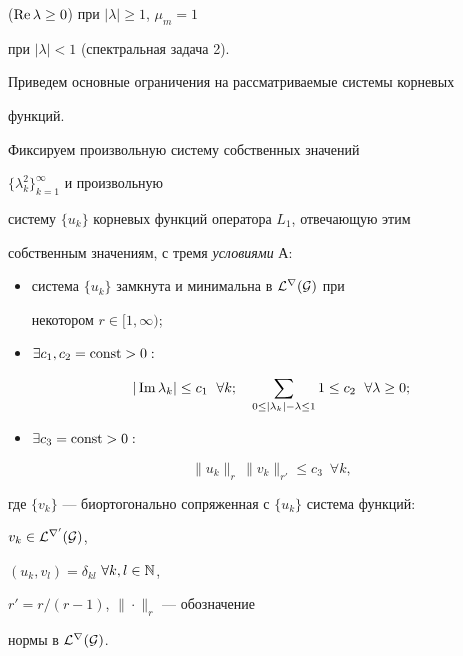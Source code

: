 ($\operatorname{Re}\lambda\ge 0$) при $|\lambda|\ge 1$, $\mu_m=1$


при $|\lambda|<1$ (спектральная задача 2).





Приведем основные ограничения на рассматриваемые системы корневых


функций.


Фиксируем произвольную систему собственных значений


$\{\lambda^2_k\}^\infty_{k=1}$ и произвольную


систему $\{u_k\}$ корневых функций оператора $L_1$, отвечающую этим


собственным значениям, с тремя {\it условиями} А:


\begin{itemize}


\item[1)] система $\{u_k\}$ замкнута и минимальна в $\cal L^r(G)$ при


некотором $r\in[1,\infty)$;


\item[2)] $\exists c_1,c_2=\operatorname{const}>0:$


\begin{equation}


|\im\lambda_k|\le c_1 \ \;\forall k;\quad


\sum_{0\le|\lambda_k|-\lambda\le 1}1\le c_2 \ \;\forall\lambda\ge 0;


\end{equation}


\item[3)] $\exists c_3=\operatorname{const}>0:$


\begin{equation}


\|u_k\|_r\,\|v_k\|_{r'}\le c_3 \ \;\forall k,


\end{equation}


\end{itemize}


где $\{v_k\}$ --- биортогонально сопряженная с $\{u_k\}$ система функций:


$v_k\in\cal L^{r'}(G)$,


$(u_k,v_l)=\delta_{kl}$ $\forall k,l\in\Bbb N$,


$r'=r/(r-1)$, $\|\cdot\|_r$ --- обозначение


нормы в $\cal L^r(G)$.





